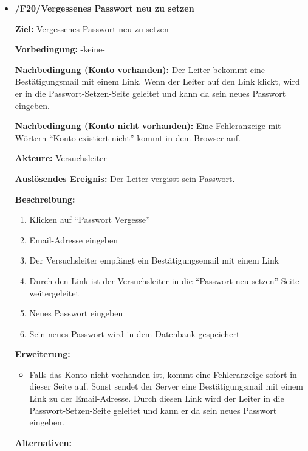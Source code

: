 \documentclass[a4paper]{scrreprt}
\begin{document}
\begin{itemize}
                \item \textbf{/F20/Vergessenes Passwort neu zu setzen}

                \par \textbf{Ziel: }Vergessenes Passwort neu zu setzen
                \par \textbf{Vorbedingung: }-keine-
                \par \textbf{Nachbedingung (Konto vorhanden): }Der Leiter bekommt eine Bestätigungsmail mit einem Link. Wenn der Leiter auf den Link klickt, wird er in die Passwort-Setzen-Seite geleitet und kann da sein neues Passwort eingeben.
                \par \textbf{Nachbedingung (Konto nicht vorhanden): }Eine Fehleranzeige mit Wörtern ``Konto existiert nicht'' kommt in dem Browser auf.
                \par \textbf{Akteure: }Versuchsleiter
                \par \textbf{Auslösendes Ereignis: }Der Leiter vergisst sein Passwort.
                \par \textbf{Beschreibung: }
                \begin{enumerate}
                    \item Klicken auf ``Passwort Vergesse''
                    \item Email-Adresse eingeben
                    \item Der Versuchsleiter empfängt ein Bestätigungsemail mit einem Link
                    \item Durch den Link ist der Versuchsleiter in die “Passwort neu setzen” Seite weitergeleitet
                    \item Neues Passwort eingeben
                    \item Sein neues Passwort wird in dem Datenbank gespeichert
                \end{enumerate}
                \par \textbf{Erweiterung: }
                \begin{itemize}
                    \item Falls das Konto nicht vorhanden ist, kommt eine Fehleranzeige sofort in dieser Seite auf. Sonst sendet der Server eine Bestätigungsmail mit einem Link zu der Email-Adresse. Durch diesen Link wird der Leiter in die Passwort-Setzen-Seite geleitet und kann er da sein neues Passwort eingeben.
                \end{itemize}
                \par \textbf{Alternativen: }


\end{itemize}
\end{document}
